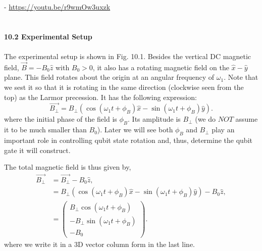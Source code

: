 \documentclass{article}
\begin{document}
- \url{https://youtu.be/r9wmOw3uxzk}\\\\\\
\textbf{\large 10.2 Experimental Setup}\\\\
The experimental setup is shown in Fig. 10.1. Besides the vertical DC magnetic
field, $\vec{B}=-B_0\hat{z}$ with $B_0>0$, it also has a rotating magnetic field on the 
$\hat{x}-\hat{y}$ plane. This field rotates about the origin at an angular frequency
of  $\omega_1$. Note that we sest it so that it is rotating in the same direction (clockwise
seen from the top) as the Larmor precession. It has the following expression:
\begin{equation}\label{eq 10.1}
    \vec{B_\bot}=B_\bot(\cos(\omega_1t+\phi_B)\hat{x}-\sin(\omega_1t+\phi_B)\hat{y}).\tag{10.1}
\end{equation}
where the initial phase of the field is $\phi_B$. Its amplitude is $B_\bot$ (we do $NOT$ assume it
to be much smaller than $B_0$). Later we will see both $\phi_B$ and $B_\bot$ play
an important role in controlling qubit state rotation and, thus, determine the qubit gate it will 
construct.

The total magnetic field is thus given by,
\begin{align*}\label{eq 10.2}
    \vec{B_\bot}&=\vec{B_\bot}-B_0\hat{z},\\
    &=B_\bot(\cos(\omega_1t+\phi_B)\hat{x}-\sin(\omega_1t+\phi_B)\hat{y})-B_0\hat{z},\\
    &=\begin{pmatrix}
        B_\bot\cos(\omega_1t+\phi_B)\\
        -B_\bot\sin(\omega_1t+\phi_B)\\ -B_0
    \end{pmatrix}.\tag{10.2}
\end{align*}
where we write it in a 3D vector column form in the last line.\\
\end{document}

